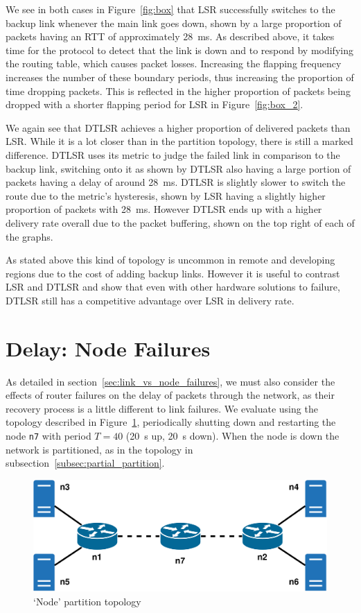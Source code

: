 \documentclass[withindex,glossary,openany]{cam-thesis}
\begin{document}
We see in both cases in Figure~\ref{fig:box} that LSR successfully switches to the backup link whenever the main link goes down, shown by a large proportion of packets having an RTT of approximately \SI{28}{\ms}. As described above, it takes time for the protocol to detect that the link is down and to respond by modifying the routing table, which causes packet losses. Increasing the flapping frequency increases the number of these boundary periods, thus increasing the proportion of time dropping packets. This is reflected in the higher proportion of packets being dropped with a shorter flapping period for LSR in Figure~\ref{fig:box_2}.

We again see that DTLSR achieves a higher proportion of delivered packets than LSR. While it is a lot closer than in the partition topology, there is still a marked difference. DTLSR uses its metric to judge the failed link in comparison to the backup link, switching onto it as shown by DTLSR also having a large portion of packets having a delay of around \SI{28}{\ms}. DTLSR is slightly slower to switch the route due to the metric's hysteresis, shown by LSR having a slightly higher proportion of packets with \SI{28}{\ms}. However DTLSR ends up with a higher delivery rate overall due to the packet buffering, shown on the top right of each of the graphs.

As stated above this kind of topology is uncommon in remote and developing regions due to the cost of adding backup links. However it is useful to contrast LSR and DTLSR and show that even with other hardware solutions to failure, DTLSR still has a competitive advantage over LSR in delivery rate.

\section{Delay: Node Failures}

As detailed in section~\ref{sec:link_vs_node_failures}, we must also consider the effects of router failures on the delay of packets through the network, as their recovery process is a little different to link failures. We evaluate using the topology described in Figure~\ref{fig:node_partition_topology}, periodically shutting down and restarting the node \texttt{n7} with period $T=40$ (\SI{20}{\s} up, \SI{20}{\s} down). When the node is down the network is partitioned, as in the topology in subsection~\ref{subsec:partial_partition}.

\begin{figure}[H]
  \centering
  \includegraphics[width=0.65\linewidth]{delay_full_partition_topology}
  \caption{`Node' partition topology}
  \label{fig:node_partition_topology}
\end{figure}
\end{document}
